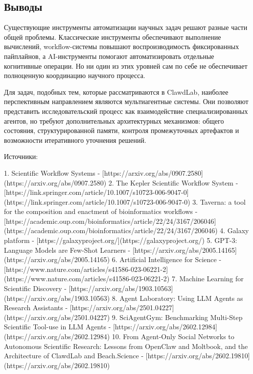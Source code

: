 \subsection{Выводы}

Существующие инструменты автоматизации научных задач решают разные части общей проблемы. Классические инструменты обеспечивают выполнение вычислений, workflow-системы повышают воспроизводимость фиксированных пайплайнов, а AI-инструменты помогают автоматизировать отдельные когнитивные операции. Но  ни один из этих уровней сам по себе не обеспечивает полноценную координацию научного процесса.

Для задач, подобных тем, которые рассматриваются в ClawdLab, наиболее перспективным направлением являются мультиагентные системы. Они позволяют представить исследовательский процесс как взаимодействие специализированных агентов, но требуют дополнительных архитектурных механизмов: общего состояния, структурированной памяти, контроля промежуточных артефактов и возможности итеративного уточнения решений.

Источники:

1. Scientific Workflow Systems - [https://arxiv.org/abs/0907.2580](https://arxiv.org/abs/0907.2580)
2. The Kepler Scientific Workflow System - [https://link.springer.com/article/10.1007/s10723-006-9047-0](https://link.springer.com/article/10.1007/s10723-006-9047-0)
3. Taverna: a tool for the composition and enactment of bioinformatics workflows - [https://academic.oup.com/bioinformatics/article/22/24/3167/206046](https://academic.oup.com/bioinformatics/article/22/24/3167/206046)
4. Galaxy platform - [https://galaxyproject.org/](https://galaxyproject.org/)
5. GPT-3: Language Models are Few-Shot Learners - [https://arxiv.org/abs/2005.14165](https://arxiv.org/abs/2005.14165)
6. Artificial Intelligence for Science - [https://www.nature.com/articles/s41586-023-06221-2](https://www.nature.com/articles/s41586-023-06221-2)
7. Machine Learning for Scientific Discovery - [https://arxiv.org/abs/1903.10563](https://arxiv.org/abs/1903.10563)
8. Agent Laboratory: Using LLM Agents as Research Assistants - [https://arxiv.org/abs/2501.04227](https://arxiv.org/abs/2501.04227)
9. SciAgentGym: Benchmarking Multi-Step Scientific Tool-use in LLM Agents - [https://arxiv.org/abs/2602.12984](https://arxiv.org/abs/2602.12984)
10. From Agent-Only Social Networks to Autonomous Scientific Research: Lessons from OpenClaw and Moltbook, and the Architecture of ClawdLab and Beach.Science - [https://arxiv.org/abs/2602.19810](https://arxiv.org/abs/2602.19810)



